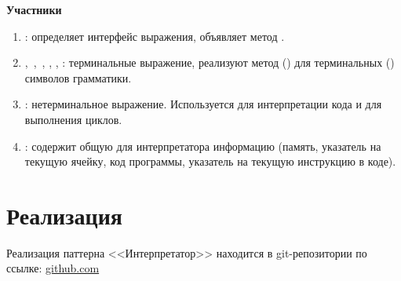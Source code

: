 \documentclass[PI,LAB]{HSEUniversity}
\begin{document}
\textbf{Участники}

\begin{enumerate}
  \item {}: определяет интерфейс выражения, объявляет метод .
  \item {},~,~, , , : терминальные выражение, реализуют метод () для терминальных () символов грамматики.
  \item {}: нетерминальное выражение. Используется для интерпретации кода и для выполнения циклов.
  \item {}: содержит общую для интерпретатора информацию (память, указатель на текущую ячейку, код программы, указатель на текущую инструкцию в коде).
\end{enumerate}

\section{Реализация}
Реализация паттерна <<Интерпретатор>> находится в git-репозитории по ссылке: \href{https://github.com/rovany706/design-patterns/tree/master/Interpreter/BrainfuckInterpreter}{github.com}
\end{document}
